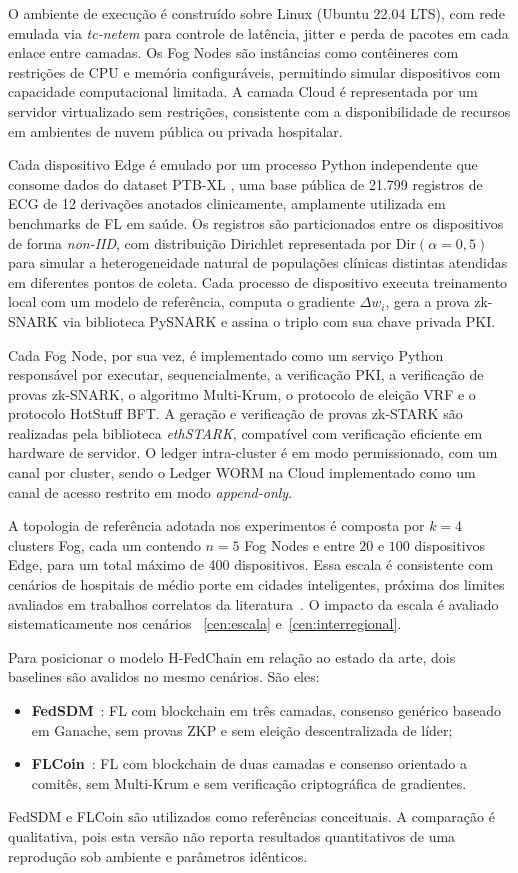 \documentclass[12pt]{article}
\begin{document}
O ambiente de execução é construído sobre Linux (Ubuntu 22.04 LTS), com rede emulada via \textit{tc-netem} para controle de latência, jitter e perda de pacotes em cada enlace entre camadas. Os Fog Nodes são instâncias como contêineres com restrições de CPU e memória configuráveis, permitindo simular dispositivos com capacidade computacional limitada. A camada Cloud é representada por um servidor virtualizado sem restrições, consistente com a disponibilidade de recursos em ambientes de nuvem pública ou privada hospitalar.

Cada dispositivo Edge é emulado por um processo Python independente que consome dados do dataset PTB-XL \cite{wagner2020ptbxl}, uma base pública de 21.799 registros de ECG de 12 derivações anotados clinicamente, amplamente utilizada em benchmarks de FL em saúde. Os registros são particionados entre os dispositivos de forma \textit{non-IID}, com distribuição Dirichlet representada por $\text{Dir}(\alpha = 0{,}5)$ para simular a heterogeneidade natural de populações clínicas distintas atendidas em diferentes pontos de coleta. Cada processo de dispositivo executa treinamento local com um modelo de referência, computa o gradiente $\Delta w_i$, gera a prova zk-SNARK via biblioteca PySNARK e assina o triplo com sua chave privada PKI.

Cada Fog Node, por sua vez, é implementado como um serviço Python responsável por executar, sequencialmente, a verificação PKI, a verificação de provas zk-SNARK, o algoritmo Multi-Krum, o protocolo de eleição VRF e o protocolo HotStuff BFT. A geração e verificação de provas zk-STARK são realizadas pela biblioteca \textit{ethSTARK}, compatível com verificação eficiente em hardware de servidor. O ledger intra-cluster é em modo permissionado, com um canal por cluster, sendo o Ledger WORM na Cloud implementado como um canal de acesso restrito em modo \textit{append-only}.

A topologia de referência adotada nos experimentos é composta por $k = 4$ clusters Fog, cada um contendo $n = 5$ Fog Nodes e entre $20$ e $100$ dispositivos Edge, para um total máximo de 400 dispositivos. Essa escala é consistente com cenários de hospitais de médio porte em cidades inteligentes, próxima dos limites avaliados em trabalhos correlatos da literatura~\cite{murthy2026,laouamri2025}. O impacto da escala é avaliado sistematicamente nos cenários ~\ref{cen:escala} e~\ref{cen:interregional}.

Para posicionar o modelo H-FedChain em relação ao estado da arte, dois baselines são avalidos no mesmo cenários. São eles:
\begin{itemize}
\item \textbf{FedSDM}~\cite{rajagopal2025}: FL com blockchain em três
camadas, consenso genérico baseado em Ganache, sem provas ZKP e sem
eleição descentralizada de líder;
\item \textbf{FLCoin}~\cite{ren2024}: FL com blockchain de duas camadas
e consenso orientado a comitês, sem Multi-Krum e sem verificação
criptográfica de gradientes.
\end{itemize}
FedSDM e FLCoin são utilizados como referências conceituais. A comparação é qualitativa, pois esta versão não reporta resultados quantitativos de uma reprodução sob ambiente e parâmetros idênticos.
\end{document}
